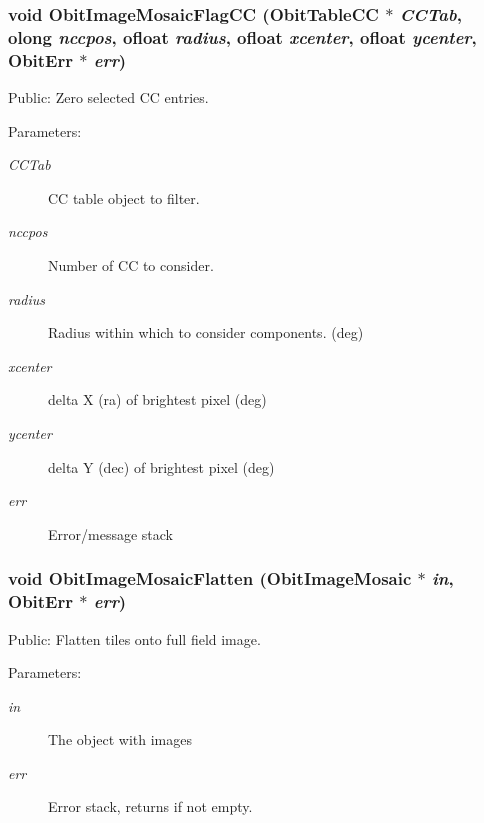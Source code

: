\subsubsection{\setlength{\rightskip}{0pt plus 5cm}void Obit\-Image\-Mosaic\-Flag\-CC ({\bf Obit\-Table\-CC} $\ast$ {\em CCTab}, {\bf olong} {\em nccpos}, {\bf ofloat} {\em radius}, {\bf ofloat} {\em xcenter}, {\bf ofloat} {\em ycenter}, {\bf Obit\-Err} $\ast$ {\em err})}\label{ObitImageMosaic_8h_a24}


Public: Zero selected CC entries. 

\begin{Desc}
\item[Parameters:]
\begin{description}
\item[{\em CCTab}]CC table object to filter. \item[{\em nccpos}]Number of CC to consider. \item[{\em radius}]Radius within which to consider components. (deg) \item[{\em xcenter}]delta X (ra) of brightest pixel (deg) \item[{\em ycenter}]delta Y (dec) of brightest pixel (deg) \item[{\em err}]Error/message stack \end{description}
\end{Desc}
\subsubsection{\setlength{\rightskip}{0pt plus 5cm}void Obit\-Image\-Mosaic\-Flatten ({\bf Obit\-Image\-Mosaic} $\ast$ {\em in}, {\bf Obit\-Err} $\ast$ {\em err})}\label{ObitImageMosaic_8h_a19}


Public: Flatten tiles onto full field image. 

\begin{Desc}
\item[Parameters:]
\begin{description}
\item[{\em in}]The object with images \item[{\em err}]Error stack, returns if not empty. \end{description}
\end{Desc}
